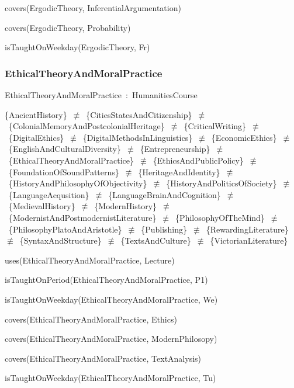 \documentclass{article}
\begin{document}
covers(ErgodicTheory, InferentialArgumentation)

covers(ErgodicTheory, Probability)

isTaughtOnWeekday(ErgodicTheory, Fr)

\subsubsection*{EthicalTheoryAndMoralPractice}

EthicalTheoryAndMoralPractice~:~HumanitiesCourse

\{AncientHistory\}~\ensuremath{\not\equiv}~\{CitiesStatesAndCitizenship\}~\ensuremath{\not\equiv}~\{ColonialMemoryAndPostcolonialHeritage\}~\ensuremath{\not\equiv}~\{CriticalWriting\}~\ensuremath{\not\equiv}~\{DigitalEthics\}~\ensuremath{\not\equiv}~\{DigitalMethodsInLinguistics\}~\ensuremath{\not\equiv}~\{EconomicEthics\}~\ensuremath{\not\equiv}~\{EnglishAndCulturalDiversity\}~\ensuremath{\not\equiv}~\{Entrepreneurship\}~\ensuremath{\not\equiv}~\{EthicalTheoryAndMoralPractice\}~\ensuremath{\not\equiv}~\{EthicsAndPublicPolicy\}~\ensuremath{\not\equiv}~\{FoundationOfSoundPatterns\}~\ensuremath{\not\equiv}~\{HeritageAndIdentity\}~\ensuremath{\not\equiv}~\{HistoryAndPhilosophyOfObjectivity\}~\ensuremath{\not\equiv}~\{HistoryAndPoliticsOfSociety\}~\ensuremath{\not\equiv}~\{LanguageAcqusition\}~\ensuremath{\not\equiv}~\{LanguageBrainAndCognition\}~\ensuremath{\not\equiv}~\{MedievalHistory\}~\ensuremath{\not\equiv}~\{ModernHistory\}~\ensuremath{\not\equiv}~\{ModernistAndPostmodernistLiterature\}~\ensuremath{\not\equiv}~\{PhilosophyOfTheMind\}~\ensuremath{\not\equiv}~\{PhilosophyPlatoAndAristotle\}~\ensuremath{\not\equiv}~\{Publishing\}~\ensuremath{\not\equiv}~\{RewardingLiterature\}~\ensuremath{\not\equiv}~\{SyntaxAndStructure\}~\ensuremath{\not\equiv}~\{TextsAndCulture\}~\ensuremath{\not\equiv}~\{VictorianLiterature\}

uses(EthicalTheoryAndMoralPractice, Lecture)

isTaughtOnPeriod(EthicalTheoryAndMoralPractice, P1)

isTaughtOnWeekday(EthicalTheoryAndMoralPractice, We)

covers(EthicalTheoryAndMoralPractice, Ethics)

covers(EthicalTheoryAndMoralPractice, ModernPhilosopy)

covers(EthicalTheoryAndMoralPractice, TextAnalysis)

isTaughtOnWeekday(EthicalTheoryAndMoralPractice, Tu)
\end{document}
